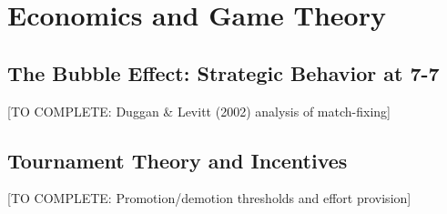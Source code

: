 \section{Economics and Game Theory}

\subsection{The Bubble Effect: Strategic Behavior at 7-7}

[TO COMPLETE: Duggan \& Levitt (2002) analysis of match-fixing]

\subsection{Tournament Theory and Incentives}

[TO COMPLETE: Promotion/demotion thresholds and effort provision]